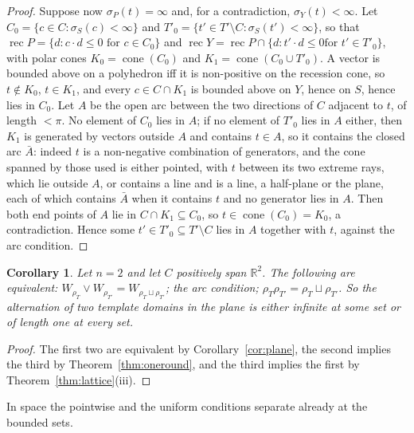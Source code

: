 \documentclass[11pt]{amsart}
\newtheorem{cor}[thm]{Corollary}
\theoremstyle{definition}
\newcommand{\rec}{\operatorname{rec}}
\begin{document}
\begin{proof}
Suppose now $\sigma_P(t)=\infty$ and, for a contradiction, $\sigma_Y(t)
<\infty$. Let $C_0=\{c\in C:\sigma_S(c)<\infty\}$ and $T'_0=\{t'\in
T'\setminus C:\sigma_S(t')<\infty\}$, so that $\rec P=\{d:c\cdot d\le0
\text{ for }c\in C_0\}$ and $\rec Y=\rec P\cap\{d:t'\cdot d\le0\text{
for }t'\in T'_0\}$, with polar cones $K_0=\operatorname{cone}(C_0)$ and
$K_1=\operatorname{cone}(C_0\cup T'_0)$. A vector is bounded above on a
polyhedron iff it is non-positive on the recession cone, so $t\notin
K_0$, $t\in K_1$, and every $c\in C\cap K_1$ is bounded above on $Y$,
hence on $S$, hence lies in $C_0$. Let $A$ be the open arc between the
two directions of $C$ adjacent to $t$, of length $<\pi$. No element of
$C_0$ lies in $A$; if no element of $T'_0$ lies in $A$ either, then
$K_1$ is generated by vectors outside $A$ and contains $t\in A$, so it
contains the closed arc $\bar A$: indeed $t$ is a non-negative
combination of generators, and the cone spanned by those used is
either pointed, with $t$ between its two extreme rays, which lie
outside $A$, or contains a line and is a line, a half-plane or the
plane, each of which contains $\bar A$ when it contains $t$ and no
generator lies in $A$. Then both end points of $A$ lie in $C\cap K_1
\subseteq C_0$, so $t\in\operatorname{cone}(C_0)=K_0$, a contradiction.
Hence some $t'\in T'_0\subseteq T'\setminus C$ lies in $A$ together
with $t$, against the arc condition.
\end{proof}

\begin{cor}\label{cor:dichotomy}
Let $n=2$ and let $C$ positively span $\mathbb R^2$. The following are
equivalent: $W_{\rho_T}\vee W_{\rho_{T'}}=W_{\rho_T\sqcup\rho_{T'}}$;
the arc condition; $\rho_T\rho_{T'}=\rho_T\sqcup\rho_{T'}$. So the
alternation of two template domains in the plane is either infinite at
some set or of length one at every set.
\end{cor}
\begin{proof}
The first two are equivalent by Corollary~\ref{cor:plane}, the second
implies the third by Theorem~\ref{thm:oneround}, and the third implies
the first by Theorem~\ref{thm:lattice}(iii).
\end{proof}

In space the pointwise and the uniform conditions separate already at
the bounded sets.
\end{document}
